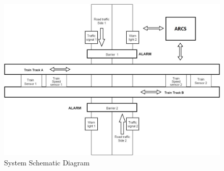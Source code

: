 \documentclass[10pt,a4paper]{article}
\begin{document}
   \begin{figure}[thpb]
      \centering
      \includegraphics[scale=0.6]{Sys_Val_D2.jpg}
      \caption{System Schematic Diagram}
      \label{figurelabel}
   \end{figure}

%
%    
    
\end{document}
